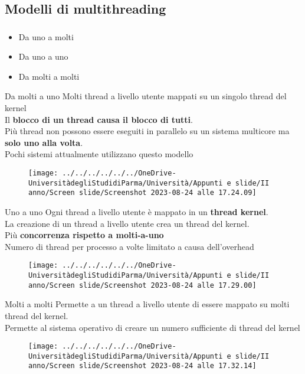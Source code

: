 \documentclass{beamer}
\newenvironment{mainframe}{
	\begin{frame}
		\frametitle{\insertsubsection}
		\framesubtitle{\insertsection}
	}{
	\end{frame}
}
\begin{document}
\subsection{Modelli di multithreading}
\begin{mainframe}
	\begin{itemize}
		\item Da uno a molti
		\item Da uno a uno
		\item Da molti a molti
	\end{itemize}
\end{mainframe}
\begin{frame}{Da molti a uno}
	Molti thread a livello utente mappati su un singolo thread del kernel\\
	Il \textbf{blocco di un thread causa il blocco di tutti}.\\
	Più thread non possono essere eseguiti in parallelo su un sistema multicore ma \textbf{solo uno alla volta}.\\
	Pochi sistemi attualmente utilizzano questo modello
	\begin{figure}
		\centering
		\texttt{[image: ../../../../../../OneDrive-UniversitàdegliStudidiParma/Università/Appunti e slide/II anno/Screen slide/Screenshot 2023-08-24 alle 17.24.09]}
	\end{figure}
\end{frame}
\begin{frame}{Uno a uno}
	Ogni thread a livello utente è mappato in un \textbf{thread kernel}.\\
	La creazione di un thread a livello utente crea un thread del kernel.\\
	Più \textbf{concorrenza rispetto a molti-a-uno}\\
	Numero di thread per processo a volte limitato a causa dell'overhead
	\begin{figure}
		\centering
		\texttt{[image: ../../../../../../OneDrive-UniversitàdegliStudidiParma/Università/Appunti e slide/II anno/Screen slide/Screenshot 2023-08-24 alle 17.29.00]}
	\end{figure}
\end{frame}
\begin{frame}{Molti a molti}
	Permette a un thread a livello utente di essere mappato su molti thread del kernel.\\
	Permette al sistema operativo di creare un numero sufficiente di thread del kernel
	\begin{figure}
		\centering
		\texttt{[image: ../../../../../../OneDrive-UniversitàdegliStudidiParma/Università/Appunti e slide/II anno/Screen slide/Screenshot 2023-08-24 alle 17.32.14]}
	\end{figure}
\end{frame}
\end{document}
